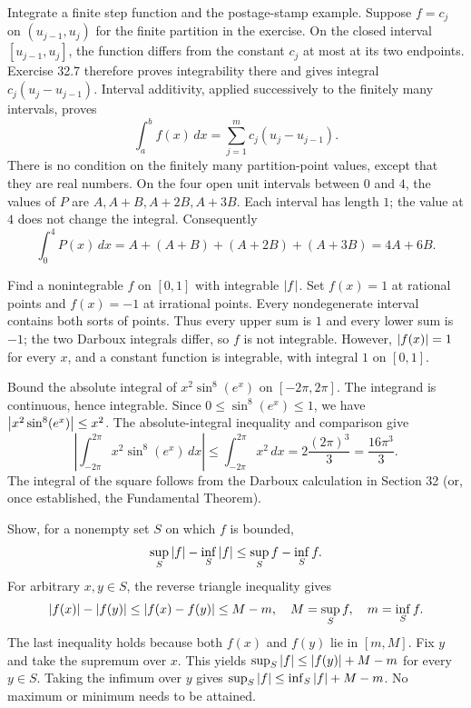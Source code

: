 \goal Integrate a finite step function and the postage-stamp example.
Suppose $f=c_j$ on $(u_{j-1},u_j)$ for the finite partition in the
exercise. On the closed interval $[u_{j-1},u_j]$, the function differs
from the constant $c_j$ at most at its two endpoints. Exercise 32.7
therefore proves integrability there and gives integral
$c_j(u_j-u_{j-1})$. Interval additivity, applied successively to the
finitely many intervals, proves
\[
 \int_a^b f(x)\,dx=\sum_{j=1}^m c_j(u_j-u_{j-1}).
\]
There is no condition on the finitely many partition-point values,
except that they are real numbers.
On the four open unit intervals between $0$ and $4$, the values of $P$
are $A,A+B,A+2B,A+3B$. Each interval has length $1$; the value at $4$
does not change the integral. Consequently
\[
 \int_0^4 P(x)\,dx=A+(A+B)+(A+2B)+(A+3B)=4A+6B.
\]

\goal Find a nonintegrable $f$ on $[0,1]$ with integrable $\left|f\right|$.
Set $f(x)=1$ at rational points and $f(x)=-1$ at irrational points.
Every nondegenerate interval contains both sorts of points. Thus every
upper sum is $1$ and every lower sum is $-1$; the two Darboux integrals
differ, so $f$ is not integrable. However, $\left|f(x)\right|=1$ for every $x$,
and a constant function is integrable, with integral $1$ on $[0,1]$.

\goal Bound the absolute integral of $x^2\sin^8(e^x)$ on $[-2\pi,2\pi]$.
The integrand is continuous, hence integrable. Since
$0\le\sin^8(e^x)\le1$, we have
$\left|x^2\sin^8(e^x)\right|\le x^2$. The absolute-integral inequality and
comparison give
\[
 \left|\int_{-2\pi}^{2\pi}x^2\sin^8(e^x)\,dx\right|
 \le\int_{-2\pi}^{2\pi}x^2\,dx
 =2\frac{(2\pi)^3}{3}=\frac{16\pi^3}{3}.
\]
The integral of the square follows from the Darboux calculation in
Section 32 (or, once established, the Fundamental Theorem).

\goal Show, for a nonempty set $S$ on which $f$ is bounded,
\[
 \sup_S\left|f\right|-\inf_S\left|f\right|\le\sup_S f-\inf_S f.
\]
For arbitrary $x,y\in S$, the reverse triangle inequality gives
\[
 \left|f(x)\right|-\left|f(y)\right|\le\left|f(x)-f(y)\right|
 \le M-m,
 \quad M=\sup_S f,\quad m=\inf_S f.
\]
The last inequality holds because both $f(x)$ and $f(y)$ lie in $[m,M]$.
Fix $y$ and take the supremum over $x$. This yields
$\sup_S\left|f\right|\le\left|f(y)\right|+M-m$ for every $y\in S$.
Taking the infimum over $y$ gives
$\sup_S\left|f\right|\le\inf_S\left|f\right|+M-m$.
No maximum or minimum needs to be attained.

